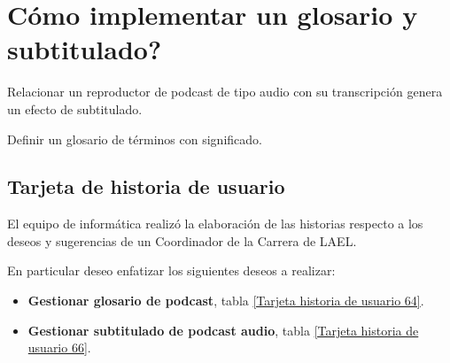 \section{\textquestiondown Cómo implementar un glosario y subtitulado?}

Relacionar un reproductor de podcast de tipo audio con su transcripción
genera un efecto de subtitulado. 

Definir un glosario de términos con significado.
 
\subsection{Tarjeta de historia de usuario}

El equipo de informática realizó la elaboración de las historias respecto
a los deseos y sugerencias de un Coordinador de la Carrera de LAEL.

En particular deseo enfatizar los siguientes deseos a realizar:

\begin{itemize}

\item \textbf{Gestionar glosario de podcast}, tabla
\ref{Tarjeta historia de usuario 64}.
\item \textbf{Gestionar subtitulado de podcast audio}, tabla 
\ref{Tarjeta historia de usuario 66}.

\end{itemize}

